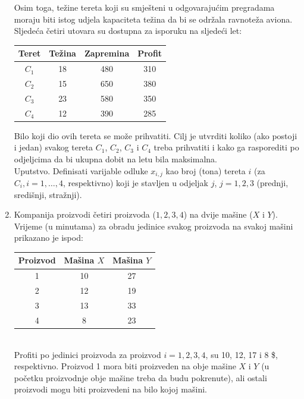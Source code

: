 \documentclass[a4paper, utf8, 11pt, colorlinks]{book}
\begin{document}
\begin{enumerate}
Osim toga, težine tereta koji su smješteni u odgovarajućim pregradama moraju biti istog udjela  kapaciteta težina da bi se održala ravnoteža aviona. Sljedeća četiri utovara su dostupna za isporuku na sljedeći let: 
	
\begin{table}[!ht]
	 \centering	
	\begin{tabular}{cccc}
	    Teret & Težina & Zapremina & Profit \\ \hline
	    $C_1$  & 18     & 480       & 310    \\
	    $C_2$  & 15     & 650       & 380    \\
	    $C_3$  & 23     & 580       & 350    \\
	    $C_4$  & 12     & 390       & 285    \\ \hline
	\end{tabular}
\end{table}
Bilo koji dio ovih tereta se može   prihvatiti. Cilj je utvrditi koliko (ako postoji i jedan) svakog tereta $C_1$, $C_2$, $C_3$ i $C_4$ treba prihvatiti i kako ga rasporediti po odjeljcima da bi ukupna dobit na letu bila maksimalna. \\
Uputstvo. Definisati varijable odluke $x_{i,j}$ kao broj (tona) tereta $i$   (za $C_i, i=1, \ldots,4$,  respektivno) koji je stavljen  u odjeljak $j$, $j=1,2,3$ (prednji, središnji, stražnji).  %
\item Kompanija proizvodi četiri proizvoda ($1,2,3,4$) na dvije mašine ($X$ i $Y$). Vrijeme (u minutama) za obradu jedinice svakog proizvoda na svakoj mašini prikazano je ispod: 
\begin{table}[!ht]
	\centering	
	\begin{tabular}{ccc}
		Proizvod   & Mašina $X$ & Mašina $Y$ \\ \hline
		1          & 10         & 27         \\
		2          & 12         & 19         \\
		3          & 13         & 33         \\
		4          & 8          & 23         \\ \hline
	\end{tabular}
\end{table}	\\
Profiti po jedinici proizvoda za proizvod $i=1,2,3,4$, su 10, 12, 17 i 8 \$, respektivno. Proizvod 1 mora biti proizveden na obje mašine $X$ i $Y$ (u početku proizvodnje obje mašine treba da budu pokrenute), ali ostali proizvodi  mogu biti proizvedeni na bilo kojoj mašini. 


\end{enumerate}
\end{document}
